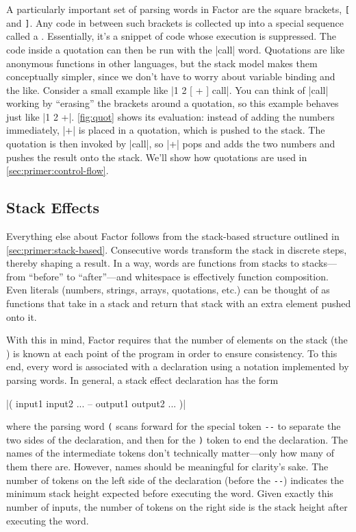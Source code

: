 

A particularly important set of parsing words in Factor are the square
brackets, \Verb|[| and \Verb|]|.  Any code in between such brackets is
collected up into a special sequence called a .  Essentially,
it's a snippet of code whose execution is suppressed.  The code inside a
quotation can then be run with the \factor|call| word.  Quotations are like
anonymous functions in other languages, but the stack model makes them
conceptually simpler, since we don't have to worry about variable binding and
the like.  Consider a small example like \factor|1 2 [ + ] call|.  You can
think of \factor|call| working by ``erasing'' the brackets around a quotation,
so this example behaves just like \factor|1 2 +|.  \cref{fig:quot} shows its
evaluation: instead of adding the numbers immediately, \factor|+| is placed in
a quotation, which is pushed to the stack.  The quotation is then invoked by
\factor|call|, so \factor|+| pops and adds the two numbers and pushes the
result onto the stack.  We'll show how quotations are used in
\cref{sec:primer:control-flow}.

\subsection{Stack Effects}\label{sec:primer:effects}

Everything else about Factor follows from the stack-based structure outlined in
\cref{sec:primer:stack-based}.  Consecutive words transform the stack in
discrete steps, thereby shaping a result.  In a way, words are functions from
stacks to stacks---from ``before'' to ``after''---and whitespace is effectively
function composition.  Even literals (numbers, strings, arrays, quotations,
etc.) can be thought of as functions that take in a stack and return that stack
with an extra element pushed onto it.

With this in mind, Factor requires that the number of elements on the stack
(the ) is known at each point of the program in order to
ensure consistency.  To this end, every word is associated with a  declaration using a notation implemented by parsing words.  In general,
a stack effect declaration has the form
%
\begin{center} \factor|( input1 input2 ... -- output1 output2 ... )|
\end{center}
%
\noindent where the parsing word \Verb|(| scans forward for the special token
\Verb|--| to separate the two sides of the declaration, and then for the
\Verb|)| token to end the declaration.  The names of the intermediate tokens
don't technically matter---only how many of them there are.  However, names
should be meaningful for clarity's sake.  The number of tokens on the left side
of the declaration (before the \Verb|--|) indicates the minimum stack height
expected before executing the word.  Given exactly this number of inputs, the
number of tokens on the right side is the stack height after executing the
word.

